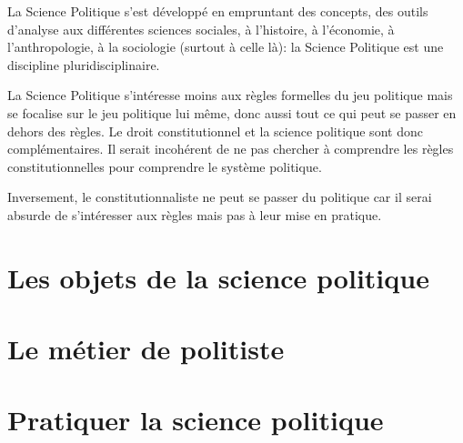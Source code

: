 \documentclass[12pt, a4paper, openany]{book}
\begin{document}
La Science Politique s'est développé en empruntant des concepts, des outils d'analyse aux différentes sciences sociales, à l'histoire, à l'économie, à l'anthropologie, à la sociologie (surtout à celle là): la Science Politique est une discipline pluridisciplinaire.

La Science Politique s'intéresse moins aux règles formelles du jeu politique mais se focalise sur le jeu politique lui même, donc aussi tout ce qui peut se passer en dehors des règles. Le droit constitutionnel et la science politique sont donc complémentaires. Il serait incohérent de ne pas chercher à comprendre les règles constitutionnelles pour comprendre le système politique. 

Inversement, le constitutionnaliste ne peut se passer du politique car il serai absurde de s'intéresser aux règles mais pas à leur mise en pratique.

	\section{Les objets de la science politique}



	\section{Le métier de politiste}

	\section{Pratiquer la science politique}
\end{document}
